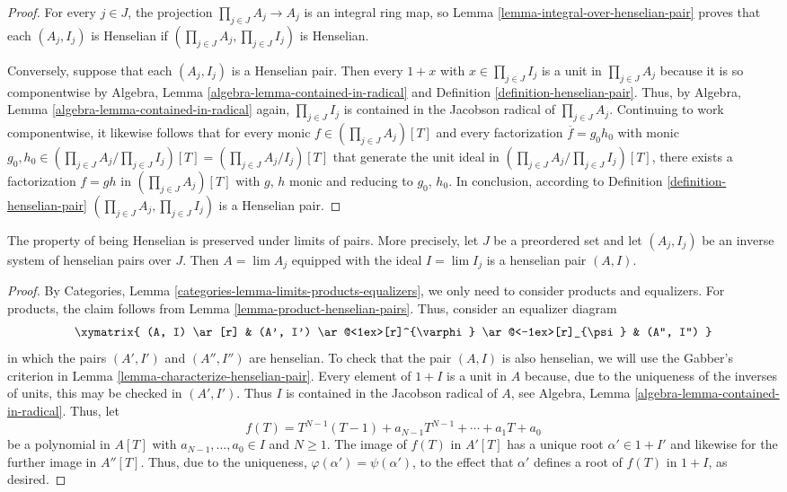 \begin{proof}
For every $j \in J$, the projection $\prod_{j \in J} A_j \rightarrow A_j$
is an integral ring map, so Lemma \ref{lemma-integral-over-henselian-pair}
proves that each $(A_j, I_j)$ is Henselian if
$(\prod_{j \in J} A_j, \prod_{j\in J} I_j)$ is Henselian.

\medskip\noindent
Conversely, suppose that each $(A_j, I_j)$ is a Henselian pair.
Then every $1 + x$ with $x \in \prod_{j \in J} I_j$  is a unit
in $\prod_{j \in J} A_j$ because it is so componentwise by
Algebra, Lemma \ref{algebra-lemma-contained-in-radical} and
Definition \ref{definition-henselian-pair}.
Thus, by Algebra, Lemma \ref{algebra-lemma-contained-in-radical}
again, $\prod_{j \in J} I_j$ is contained in the Jacobson radical
of $\prod_{j \in J} A_j$. Continuing to work componentwise, it
likewise follows that for every monic $f \in (\prod_{j \in J} A_j)[T]$
and every factorization $\overline{f} = g_0h_0$ with monic
$g_0, h_0 \in (\prod_{j \in J} A_j / \prod_{j \in J} I_j)[T] =
(\prod_{j \in J} A_j/I_j)[T]$ that generate the unit ideal in
$(\prod_{j \in J} A_j / \prod_{j \in J} I_j)[T]$, there exists a
factorization $f = gh$ in $(\prod_{j \in J} A_j)[T]$ with $g$, $h$ monic
and reducing to $g_0$, $h_0$. In conclusion, according to
Definition \ref{definition-henselian-pair}
$(\prod_{j \in J} A_j, \prod_{j\in J} I_j)$ is a Henselian pair.
\end{proof}

\begin{lemma}
\label{lemma-limits-henselian}
The property of being Henselian is preserved under limits of pairs.
More precisely, let $J$ be a preordered set and let $(A_j, I_j)$
be an inverse system of henselian pairs over $J$.
Then $A = \lim A_j$ equipped with the ideal $I = \lim I_j$
is a henselian pair $(A, I)$.
\end{lemma}

\begin{proof}
By Categories, Lemma \ref{categories-lemma-limits-products-equalizers},
we only need to consider products and equalizers.
For products, the claim follows from
Lemma \ref{lemma-product-henselian-pairs}.
Thus, consider an equalizer diagram
$$
\xymatrix{
(A, I) \ar[r] & (A', I')
\ar@<1ex>[r]^{\varphi} \ar@<-1ex>[r]_{\psi}
&
(A'', I'')  
}
$$
in which the pairs $(A', I')$ and $(A'', I'')$ are henselian.
To check that the pair $(A, I)$ is also henselian, we will use the
Gabber's criterion in Lemma \ref{lemma-characterize-henselian-pair}.
Every element of $1 + I$ is a unit in $A$ because,
due to the uniqueness of the inverses of units,
this may be checked in $(A', I')$.
Thus $I$ is contained in the Jacobson radical of $A$, see
Algebra, Lemma \ref{algebra-lemma-contained-in-radical}.
Thus, let 
$$
f(T) = T^{N - 1}(T - 1) + a_{N - 1} T^{N - 1} + \dotsb + a_1 T + a_0
$$
be a polynomial in $A[T]$ with $a_{N - 1}, \dotsc, a_0 \in I$ and $N \ge 1$.
The image of $f(T)$ in $A'[T]$ has a unique root $\alpha' \in 1 + I'$
and likewise for the further image in $A''[T]$.
Thus, due to the uniqueness, $\varphi(\alpha') = \psi(\alpha')$,
to the effect that $\alpha'$ defines a root of $f(T)$ in $1 + I$, as desired.
\end{proof}

